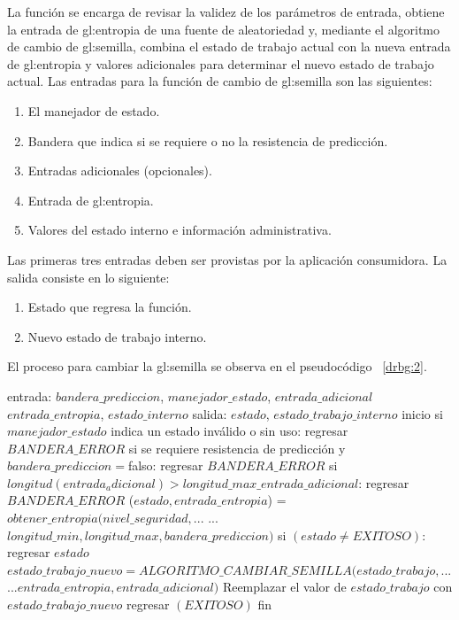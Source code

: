 La función se encarga de revisar la validez de los parámetros de entrada,
obtiene la entrada de \gls{gl:entropia} de una fuente de aleatoriedad y,
mediante el algoritmo de cambio de \gls{gl:semilla}, combina el estado de
trabajo actual con la nueva entrada de \gls{gl:entropia} y valores
adicionales para determinar el nuevo estado de trabajo actual. Las entradas
para la función de cambio de \gls{gl:semilla} son las siguientes:

\begin{enumerate}
  \item El manejador de estado.
  \item Bandera que indica si se requiere o no la resistencia de predicción.
  \item Entradas adicionales (opcionales).
  \item Entrada de \gls{gl:entropia}.
  \item Valores del estado interno e información administrativa.
\end{enumerate}

Las primeras tres entradas deben ser provistas por la aplicación
consumidora. La salida consiste en lo siguiente:

\begin{enumerate}
  \item Estado que regresa la función.
  \item Nuevo estado de trabajo interno.
\end{enumerate}

El proceso para cambiar la \gls{gl:semilla} se observa en el pseudocódigo
~\ref{drbg:2}.

\begin{pseudocodigo}[caption={DRBG, cambio de semilla.}, label={drbg:2}]
    entrada:  $bandera\_prediccion$, $manejador\_estado$, $entrada\_adicional$
              $entrada\_entropia$, $estado\_interno$
    salida:   $estado$, $estado\_trabajo\_interno$
    inicio
      si $manejador\_estado$ indica un estado inválido o sin uso:
        regresar $BANDERA\_ERROR$
      si se requiere resistencia de predicción y $bandera\_prediccion=$falso:
        regresar $BANDERA\_ERROR$
      si $longitud(entrada_adicional) > longitud\_max\_entrada\_adicional$:
        regresar $BANDERA\_ERROR$
      ($estado, entrada\_entropia$) = $obtener\_entropia(nivel\_seguridad,$...
        ... $longitud\_min, longitud\_max, bandera\_prediccion)$
      si $(estado \neq EXITOSO)$:
        regresar $estado$
      $estado\_trabajo\_nuevo= ALGORITMO\_CAMBIAR\_SEMILLA(estado\_trabajo,$...
        ...$entrada\_entropia, entrada\_adicional)$
      Reemplazar el valor de $estado\_trabajo$ con $estado\_trabajo\_nuevo$
      regresar $(EXITOSO)$
    fin
\end{pseudocodigo}

